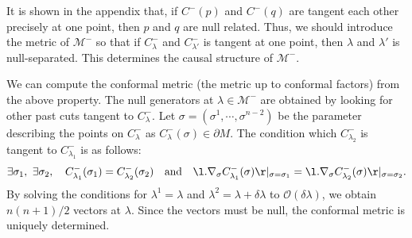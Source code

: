 \documentclass[12pt]{article}
\begin{document}
It is shown in the appendix that, if $C^-(p)$ and $C^-(q)$ are tangent each other 
precisely at one point, then $p$ and $q$ are null related.
Thus, we should introduce the metric of $\mathcal M^-$ so that if $C^-_{\lambda}$ and $C^-_{\lambda'}$
is tangent at one point, then $\lambda$ and $\lambda'$ is null-separated.
This determines the causal structure of $\mathcal M^-$.

We can compute the conformal metric (the metric up to conformal factors) from the above property.
The null generators at $\lambda\in \mathcal M^-$ are obtained by looking for other past cuts tangent to $C^-_{\lambda}$.
Let $\sigma = (\sigma^1,\cdots,\sigma^{n-2})$ be the parameter describing the points on 
$C^-_{\lambda}$ as $C^-_{\lambda}(\sigma) \in \partial M$.
The condition which $C^-_{\lambda_2}$ is tangent to $C^-_{\lambda_1}$ is as follows:
\begin{align}
	\exists\sigma_1,~\exists\sigma_2,\quad C^-_{\lambda_1}(\sigma_1) = C^-_{\lambda_2}(\sigma_2)\quad\mathrm{and}\quad \l.\nabla_{\sigma} C^-_{\lambda_1}(\sigma)\r|_{\sigma = \sigma_1} = \l.\nabla_{\sigma} C^-_{\lambda_2}(\sigma) \r|_{\sigma = \sigma_2}.
\end{align}
By solving the conditions for $\lambda^1 = \lambda$ and $\lambda^2 = \lambda + \delta\lambda$ to 
$\mathcal O(\delta\lambda)$, we obtain $n(n+1)/2$ vectors at $\lambda$.
Since the vectors must be null, the conformal metric is uniquely determined.


 

\end{document}
